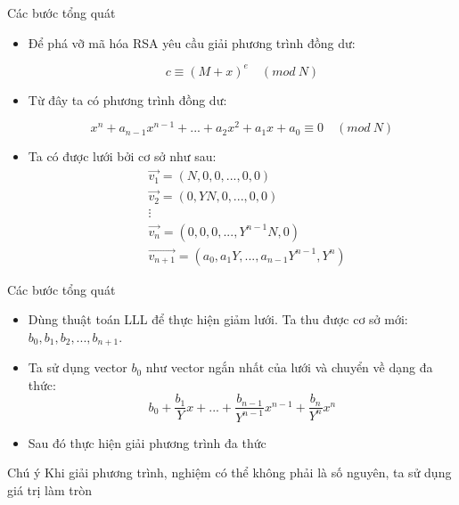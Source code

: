 \begin{frame}{Các bước tổng quát}


 


    \begin{itemize}
        \item  Để phá  vỡ mã hóa RSA   yêu cầu giải phương trình đồng dư:
        
        $$c \equiv (M + x)^e \quad (mod \ N)$$
        \item   Từ đây ta có phương trình đồng dư:
        
        
        $$x^n + a_{n-1}x^{n-1} + ... + a_2x^2 + a_1x + a_0 \equiv 0 \quad (mod \ N)  $$
        
        \item    Ta có được lưới bởi cơ sở như sau:
    $$
      \begin{aligned}
          &\Vec{v_1} = (N,0,0,...,0,0)\\
          &\Vec{v_2} = (0,YN,0,...,0,0)\\
          &\vdots\\
          &\Vec{v_n} = (0,0,0,...,Y^{n-1}N,0)\\
          &\Vec{v_{n+1}} = (a_0,a_1Y,...,a_{n-1}Y^{n-1},Y^{n})
      \end{aligned}    
     $$ 
    
    \end{itemize} 
\end{frame}
\begin{frame}{Các bước tổng quát}


\begin{itemize}
    \item  Dùng thuật toán LLL để thực hiện giảm lưới. Ta thu được cơ sở mới: $b_0,b_1,b_2,...,b_{n+1}$. 
    \item   Ta sử dụng vector $b_0$ như vector ngắn nhất của lưới và chuyển về dạng đa thức: 
    $$b_0 + \frac{b_1}{Y}x + ... + \frac{b_{n-1}}{Y^{n-1}}x^{n-1} + \frac{b_n}{Y^n}x^n  $$
    \item    Sau đó thực hiện giải phương trình đa thức
\end{itemize} 
    
    
\begin{block}{Chú ý}
Khi giải phương trình, nghiệm có thể không phải là số nguyên, ta sử dụng giá trị làm tròn
\end{block}

    
    \end{frame}
